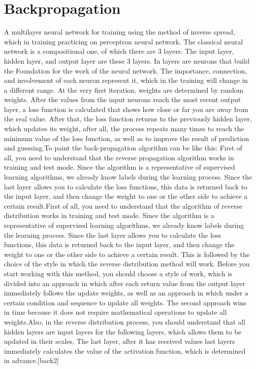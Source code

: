 \section{Backpropagation}\label{sec:3.7}
\par A multilayer neural network for training using the method of inverse spread, which in training practicing on perceptron neural network. The classical neural network is a compositional one, of which there are 3 layers. The input layer, hidden layer, and output layer are these 3 layers. In layers are neurons that build the Foundation for the work of the neural network. The importance, connection, and involvement of each neuron represent it, which in the training will change in a different range. At the very first iteration, weights are determined by random weights. After the values from the input neurons reach the most recent output layer, a loss function is calculated that shows how close or far you are away from the real value. After that, the loss function returns to the previously hidden layer, which updates its weight, after all, the process repeats many times to reach the minimum value of the loss function, as well as to improve the result of prediction and guessing.To paint the back-propagation algorithm can be like this: First of all, you need to understand that the reverse propagation algorithm works in training and test mode. Since the algorithm is a representative of supervised learning algorithms, we already know labels during the learning process. Since the last layer allows you to calculate the loss functions, this data is returned back to the input layer, and then change the weight to one or the other side to achieve a certain result.First of all, you need to understand that the algorithm of reverse distribution works in training and test mode. Since the algorithm is a representative of supervised learning algorithms, we already know labels during the learning process. Since the last layer allows you to calculate the loss functions, this data is returned back to the input layer, and then change the weight to one or the other side to achieve a certain result. This is followed by the choice of the style in which the reverse distribution method will work. Before you start working with this method, you should choose a style of work, which is divided into an approach in which after each return value from the output layer immediately follows the update weights, as well as an approach in which under a certain condition and sequence to update all weights. The second approach wins in time because it does not require mathematical operations to update all weights.Also, in the reverse distribution process, you should understand that all hidden layers are input layers for the following layers, which allows them to be updated in their scales. The last layer, after it has received values last layers immediately calculates the value of the activation function, which is determined in advance.[back2]

